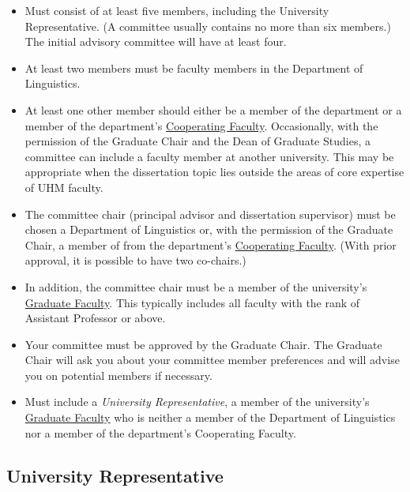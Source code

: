 \documentclass[
]{book}
\providecommand{\tightlist}{%
  \setlength{\itemsep}{0pt}\setlength{\parskip}{0pt}}
\begin{document}
\begin{itemize}
\tightlist
\item
  Must consist of at least five members, including the University Representative. (A committee usually contains no more than six members.) The initial advisory committee will have at least four.
\item
  At least two members must be faculty members in the Department of Linguistics.
\item
  At least one other member should either be a member of the department or a member of the department's \href{http://manoa.hawaii.edu/linguistics/people/}{Cooperating Faculty}. Occasionally, with the permission of the Graduate Chair and the Dean of Graduate Studies, a committee can include a faculty member at another university. This may be appropriate when the dissertation topic lies outside the areas of core expertise of UHM faculty.\\
\item
  The committee chair (principal advisor and dissertation supervisor) must be chosen a Department of Linguistics or, with the permission of the Graduate Chair, a member of from the department's \href{http://manoa.hawaii.edu/linguistics/people/}{Cooperating Faculty}. (With prior approval, it is possible to have two co-chairs.)
\item
  In addition, the committee chair must be a member of the university's \href{http://manoa.hawaii.edu/graduate/content/select-committee-member}{Graduate Faculty}. This typically includes all faculty with the rank of Assistant Professor or above.
\item
  Your committee must be approved by the Graduate Chair. The Graduate Chair will ask you about your committee member preferences and will advise you on potential members if necessary.
\item
  Must include a \emph{University Representative}, a member of the university's \href{http://manoa.hawaii.edu/graduate/content/select-committee-member}{Graduate Faculty} who is neither a member of the Department of Linguistics nor a member of the department's Cooperating Faculty.
\end{itemize}

\subsection*{University Representative}\label{university-representative}
\end{document}
